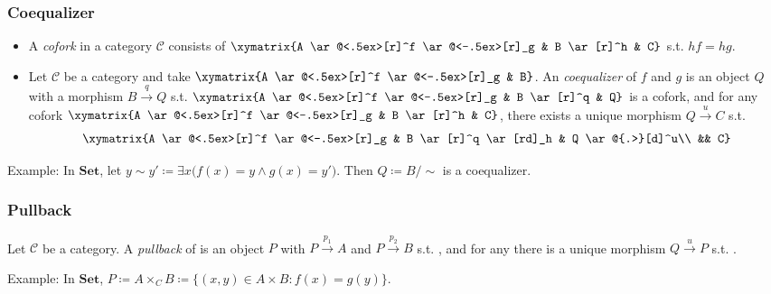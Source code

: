 \documentclass[UTF8,aspectratio=43,11pt,colorlinks,compress,openany]{beamer}%
\begin{document}
\begin{frame}\frametitle{Coequalizer}
\setlength\abovedisplayskip{0pt}
\setlength\belowdisplayskip{0pt}
\begin{itemize}
	\item A \emph{cofork} in a category $\mathcal{C}$ consists of $\xymatrix{A \ar@<.5ex>[r]^f \ar@<-.5ex>[r]_g & B \ar[r]^h & C}$ s.t. $hf=hg$.
	\item Let $\mathcal{C}$ be a category and take $\xymatrix{A \ar@<.5ex>[r]^f \ar@<-.5ex>[r]_g & B}$. An \emph{coequalizer} of $f$ and $g$ is an object $Q$ with a morphism $B\xrightarrow{q} Q$ s.t. $\xymatrix{A \ar@<.5ex>[r]^f \ar@<-.5ex>[r]_g & B \ar[r]^q & Q}$ is a cofork, and for any cofork $\xymatrix{A \ar@<.5ex>[r]^f \ar@<-.5ex>[r]_g & B \ar[r]^h & C}$, there exists a unique morphism $Q\xrightarrow{u} C$ s.t. 
\[
\begin{array}{c}
\xymatrix{A \ar@<.5ex>[r]^f \ar@<-.5ex>[r]_g & B \ar[r]^q \ar[rd]_h & Q \ar@{.>}[d]^u\\
&& C}
\end{array}
\]
\end{itemize}
Example: In $\mathbf{Set}$, let $y\sim y'\coloneqq \exists x\big(f(x)=y\wedge g(x)=y'\big)$. Then $Q\coloneqq B/\sim$ is a coequalizer.
\end{frame}

\begin{frame}\frametitle{Pullback}
\setlength\abovedisplayskip{0pt}
\setlength\belowdisplayskip{0pt}
Let $\mathcal{C}$ be a category. A \emph{pullback} of  is an object $P$ with $P\xrightarrow{p_1} A$ and $P\xrightarrow{p_2} B$ s.t. , and for any  there is a unique morphism $Q\xrightarrow{u} P$ s.t.
.

Example: In $\mathbf{Set}$, $P\coloneqq A\times_C B\coloneqq \big\{(x,y)\in A\times B: f(x)=g(y)\big\}$.
\end{frame}
\end{document}
